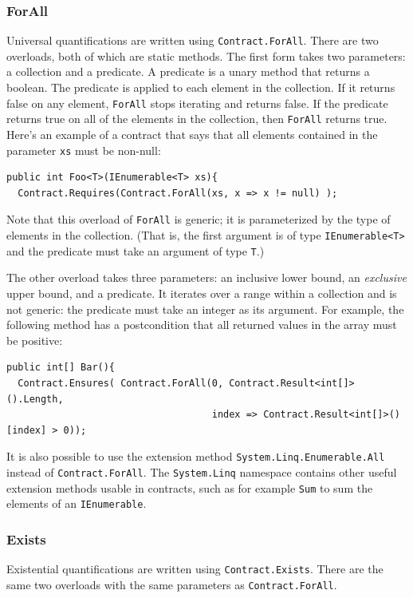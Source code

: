 \documentclass{article}
\newcommand{\code}[1]{\lstinline{#1}}
\begin{document}
\subsubsection{ForAll}
Universal quantifications are written using \code{Contract.ForAll}. There
are two overloads, both of which are static methods. The first form
takes two parameters: a collection and a predicate. A predicate is a
unary method that returns a boolean. The predicate is applied to each
element in the collection. If it returns false on any element, \code{ForAll}
stops iterating and returns false. If the predicate returns true on
all of the elements in the collection, then \code{ForAll} returns
true. Here's an example of a contract that says that all elements contained
in the parameter \code{xs} must be non-null:
\begin{lstlisting}
public int Foo<T>(IEnumerable<T> xs){
  Contract.Requires(Contract.ForAll(xs, x => x != null) );
\end{lstlisting}
Note that this overload of \code{ForAll} is
generic; it is parameterized by the type of elements in the
collection. (That is, the first argument is of type \code{IEnumerable<T>} and
the predicate must take an argument of type \code{T}.) 

The other overload takes three parameters: an inclusive lower bound, an \emph{exclusive} upper
bound, and a predicate. It iterates over a range within a collection
and is not generic: the predicate must take an integer as its
argument. For example, the following method has a postcondition that
all returned values in the array must be positive:
\begin{lstlisting}
public int[] Bar(){
  Contract.Ensures( Contract.ForAll(0, Contract.Result<int[]>().Length, 
                                    index => Contract.Result<int[]>()[index] > 0));
\end{lstlisting}
It is also possible to use the extension method
\code{System.Linq.Enumerable.All} instead of
\code{Contract.ForAll}. The \code{System.Linq} namespace contains
other useful extension methods usable in contracts, such as for example \code{Sum} to sum
the elements of an \code{IEnumerable}.

\subsubsection{Exists}
Existential quantifications are written using
\code{Contract.Exists}. There are the same two overloads with the
same parameters as \code{Contract.ForAll}.
\end{document}
